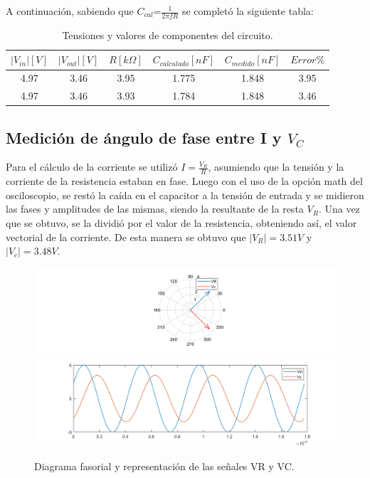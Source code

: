 A continuación, sabiendo que $C_{cal}\text{=}\frac{1}{2\pi fR}$ se completó la siguiente tabla:

\begin{table}[!htb]
\centering
\begin{tabular}{|c|c|c|c|c|c|}
\hline 
$|V_{in}|[V]$ & $|V_{out}|[V]$ & $R[k\Omega]$ & $C_{calculado}[nF]$ & $C_{medido}[nF]$ & $Error\%$\\
\hline 
\hline 
4.97 & 3.46 & 3.95 & 1.775 & 1.848 & 3.95\\
\hline 
4.97 & 3.46 & 3.93 & 1.784 & 1.848 & 3.46\\
\hline 
\end{tabular}
\caption{Tensiones y valores de componentes del circuito.}
\end{table}

\subsection{Medición de ángulo de fase entre I y $V_C$}

Para el cálculo de la corriente se utilizó $I=\frac{V_{R}}{R}$, asumiendo que la tensión y la corriente de la resistencia estaban en fase. 
Luego con el uso de la opción math del osciloscopio, se restó la caída en el capacitor a la tensión de entrada y se midieron las fases y amplitudes de las mismas, siendo la resultante de la resta $V_R$. Una vez que se obtuvo, se la dividió por el valor de la resistencia, obteniendo así, el valor vectorial de la corriente.
De esta manera se obtuvo que $|V_{R}|=3.51V$ y $|V_{c}|=3.48V$.

\begin{figure}[H]
\centering
\includegraphics[scale=0.5]{1-2.png}
\includegraphics[scale=0.5]{1-2b.png}
\caption{Diagrama fasorial y representación de las señales VR y VC.}
\label{diagfasorial}
\end{figure}


